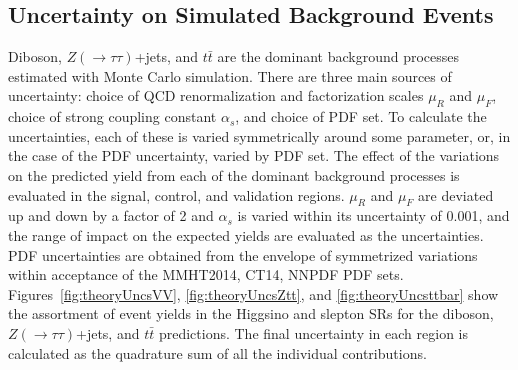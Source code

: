 \subsection{Uncertainty on Simulated Background Events}
Diboson, $Z(\rightarrow\tau\tau)$+jets, and $t\bar{t}$ are the dominant background processes estimated with Monte Carlo simulation.  There are three main sources of uncertainty: choice of QCD renormalization and factorization scales $\mu_R$ and $\mu_F$, choice of strong coupling constant $\alpha_s$, and choice of PDF set.  To calculate the uncertainties, each of these is varied symmetrically around some parameter, or, in the case of the PDF uncertainty, varied by PDF set.  The effect of the variations on the predicted yield from each of the dominant background processes is evaluated in the signal, control, and validation regions. $\mu_R$ and $\mu_F$ are deviated up and down by a factor of 2 and $\alpha_s$ is varied within its uncertainty of 0.001, and the range of impact on the expected yields are evaluated as the uncertainties.  PDF uncertainties are obtained from the envelope of symmetrized variations within acceptance of the MMHT2014, CT14, NNPDF PDF sets.  Figures~\ref{fig:theoryUncsVV}, \ref{fig:theoryUncsZtt}, and \ref{fig:theoryUncsttbar} show the assortment of event yields in the Higgsino and slepton SRs for the diboson, $Z(\rightarrow\tau\tau)$+jets, and $t\bar{t}$ predictions.  The final uncertainty in each region is calculated as the quadrature sum of all the individual contributions.  

